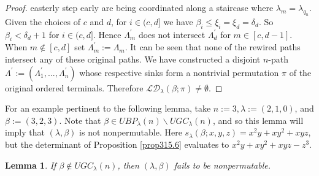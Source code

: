 \documentclass[11pt]{article}
\newtheorem{lem}[thm]{Lemma}
\theoremstyle{definition}
\theoremstyle{remark}
\numberwithin{equation}{section}
\begin{document}
\begin{spacing}{1.35}
\begin{proof}
easterly step early are being coordinated along a staircase where $\lambda_m = \lambda_{q_h}$.  Given the choices of $c$ and $d$, for $i \in (c,d]$ we have $\beta_i \leq \xi_i = \xi_d = \delta_d$.  So $\beta_i < \delta_d +1$ for $i \in (c,d]$.  Hence $\Lambda_m^\prime$ does not intersect $\Lambda_d^\prime$ for $m \in [c, d-1]$.  When $m \notin [c,d]$ set $\Lambda_m^\prime := \Lambda_m$.  It can be seen that none of the rewired paths intersect any of these original paths.  We have constructed a disjoint $n$-path $\Lambda^\prime := (\Lambda_1^\prime, ... , \Lambda_n^\prime)$ whose respective sinks form a nontrivial permutation $\pi$ of the original ordered terminals.  Therefore $\mathcal{LD}_\lambda(\beta;\pi) \neq \emptyset$.  \end{proof}



For an example pertinent to the following lemma, take $n := 3, \lambda := (2,1,0)$, and $\beta := (3,2,3)$.  Note that $\beta \in UBP_\lambda(n) \backslash UGC_\lambda(n)$, and so this lemma will imply that $(\lambda, \beta)$ is not nonpermutable.  Here $s_\lambda(\beta;x,y,z) = x^2y + xy^2 + xyz$, but the determinant of Proposition \ref{prop315.6} evaluates to $x^2y + xy^2 + xyz - z^3$.

\begin{lem}\label{lemma434.6}If $\beta \notin UGC_\lambda(n)$, then $(\lambda, \beta)$ fails to be nonpermutable.  \end{lem}


\end{spacing}
\end{document}
